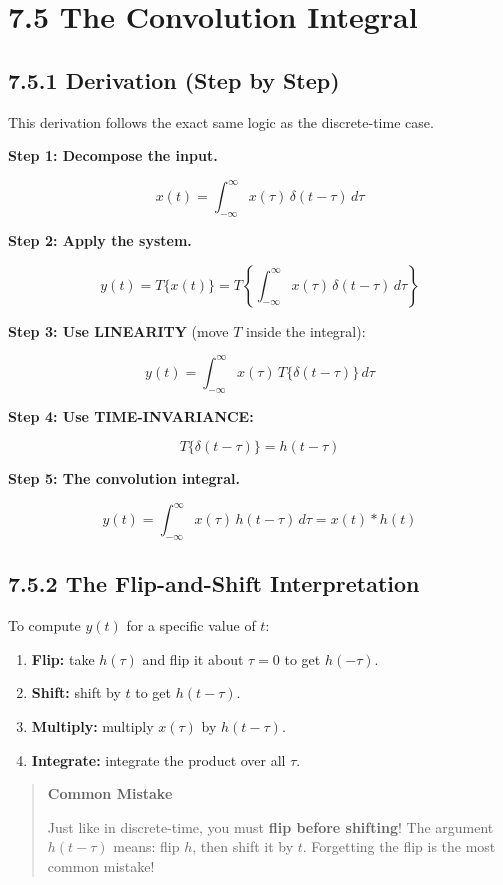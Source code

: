 \documentclass[11pt]{article}
\begin{document}
\section*{7.5 The Convolution Integral}

\subsection*{7.5.1 Derivation (Step by Step)}

This derivation follows the exact same logic as the discrete-time case.

\textbf{Step 1: Decompose the input.}

\[x(t) = \int_{-\infty}^{\infty} x(\tau)\,\delta(t - \tau)\,d\tau\]

\textbf{Step 2: Apply the system.}

\[y(t) = T\{x(t)\} = T\!\left\{\int_{-\infty}^{\infty} x(\tau)\,\delta(t - \tau)\,d\tau\right\}\]

\textbf{Step 3: Use LINEARITY} (move $T$ inside the integral):

\[y(t) = \int_{-\infty}^{\infty} x(\tau)\,T\{\delta(t - \tau)\}\,d\tau\]

\textbf{Step 4: Use TIME-INVARIANCE:}

\[T\{\delta(t - \tau)\} = h(t - \tau)\]

\textbf{Step 5: The convolution integral.}

\[\boxed{\;y(t) = \int_{-\infty}^{\infty} x(\tau)\,h(t - \tau)\,d\tau = x(t)*h(t)\;}\]

\subsection*{7.5.2 The Flip-and-Shift Interpretation}

To compute $y(t)$ for a specific value of $t$:

\begin{enumerate}
  \item \textbf{Flip:} take $h(\tau)$ and flip it about $\tau = 0$ to get $h(-\tau)$.
  \item \textbf{Shift:} shift by $t$ to get $h(t - \tau)$.
  \item \textbf{Multiply:} multiply $x(\tau)$ by $h(t - \tau)$.
  \item \textbf{Integrate:} integrate the product over all $\tau$.
\end{enumerate}

\begin{quote}
\textbf{Common Mistake}

Just like in discrete-time, you must \textbf{flip before shifting}! The argument $h(t - \tau)$ means: flip $h$, then shift it by $t$. Forgetting the flip is the most common mistake!
\end{quote}
\end{document}
